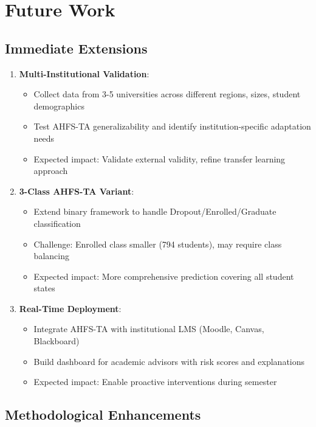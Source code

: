 \section{Future Work}

\subsection{Immediate Extensions}

\begin{enumerate}
\item \textbf{Multi-Institutional Validation}:
\begin{itemize}
\item Collect data from 3-5 universities across different regions, sizes, student demographics
\item Test AHFS-TA generalizability and identify institution-specific adaptation needs
\item Expected impact: Validate external validity, refine transfer learning approach
\end{itemize}

\item \textbf{3-Class AHFS-TA Variant}:
\begin{itemize}
\item Extend binary framework to handle Dropout/Enrolled/Graduate classification
\item Challenge: Enrolled class smaller (794 students), may require class balancing
\item Expected impact: More comprehensive prediction covering all student states
\end{itemize}

\item \textbf{Real-Time Deployment}:
\begin{itemize}
\item Integrate AHFS-TA with institutional LMS (Moodle, Canvas, Blackboard)
\item Build dashboard for academic advisors with risk scores and explanations
\item Expected impact: Enable proactive interventions during semester
\end{itemize}
\end{enumerate}

\subsection{Methodological Enhancements}

